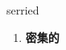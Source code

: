 
\begin{frame}
{\huge serried}
\begin{center}
\begin{enumerate}\Large
  \item \textbf{密集的}
\end{enumerate}
\end{center}
\end{frame}
